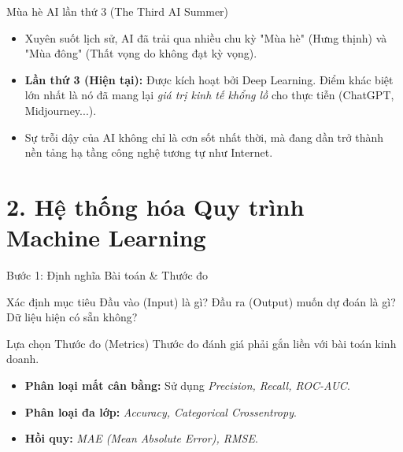 \documentclass[aspectratio=169]{beamer}
\begin{document}
\begin{frame}{Mùa hè AI lần thứ 3 (The Third AI Summer)}
    \begin{itemize}
        \item Xuyên suốt lịch sử, AI đã trải qua nhiều chu kỳ "Mùa hè" (Hưng thịnh) và "Mùa đông" (Thất vọng do không đạt kỳ vọng).
        \item \textbf{Lần thứ 3 (Hiện tại):} Được kích hoạt bởi Deep Learning. Điểm khác biệt lớn nhất là nó đã mang lại \textit{giá trị kinh tế khổng lồ} cho thực tiễn (ChatGPT, Midjourney...).
        \item Sự trỗi dậy của AI không chỉ là cơn sốt nhất thời, mà đang dần trở thành nền tảng hạ tầng công nghệ tương tự như Internet.
    \end{itemize}
\end{frame}

\section{2. Hệ thống hóa Quy trình Machine Learning}

\begin{frame}{Bước 1: Định nghĩa Bài toán \& Thước đo}
    \begin{block}{Xác định mục tiêu}
        Đầu vào (Input) là gì? Đầu ra (Output) muốn dự đoán là gì? Dữ liệu hiện có sẵn không?
    \end{block}
    
    \begin{block}{Lựa chọn Thước đo (Metrics)}
        Thước đo đánh giá phải gắn liền với bài toán kinh doanh.
        \begin{itemize}
            \item \textbf{Phân loại mất cân bằng:} Sử dụng \textit{Precision, Recall, ROC-AUC}.
            \item \textbf{Phân loại đa lớp:} \textit{Accuracy, Categorical Crossentropy}.
            \item \textbf{Hồi quy:} \textit{MAE (Mean Absolute Error), RMSE}.
        \end{itemize}
    \end{block}
\end{frame}
\end{document}
